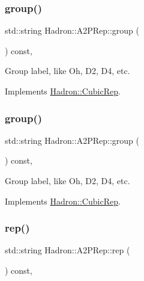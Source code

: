 \subsubsection{\texorpdfstring{group()}{group()}\hspace{0.1cm}{\footnotesize\ttfamily [1/2]}}
{\footnotesize\ttfamily std\+::string Hadron\+::\+A2\+P\+Rep\+::group (\begin{DoxyParamCaption}{ }\end{DoxyParamCaption}) const\hspace{0.3cm}{\ttfamily [inline]}, {\ttfamily [virtual]}}

Group label, like Oh, D2, D4, etc. 

Implements \mbox{\hyperlink{structHadron_1_1CubicRep_a0748f11ec87f387062c8e8981339a29c}{Hadron\+::\+Cubic\+Rep}}.

\mbox{\label{structHadron_1_1A2PRep_accbc36395d6c73bf53f8914b3219f902}} 
\subsubsection{\texorpdfstring{group()}{group()}\hspace{0.1cm}{\footnotesize\ttfamily [2/2]}}
{\footnotesize\ttfamily std\+::string Hadron\+::\+A2\+P\+Rep\+::group (\begin{DoxyParamCaption}{ }\end{DoxyParamCaption}) const\hspace{0.3cm}{\ttfamily [inline]}, {\ttfamily [virtual]}}

Group label, like Oh, D2, D4, etc. 

Implements \mbox{\hyperlink{structHadron_1_1CubicRep_a0748f11ec87f387062c8e8981339a29c}{Hadron\+::\+Cubic\+Rep}}.

\mbox{\label{structHadron_1_1A2PRep_aa2ba2d1bc832b1d1fdba1befcfe8a256}} 
\subsubsection{\texorpdfstring{rep()}{rep()}\hspace{0.1cm}{\footnotesize\ttfamily [1/2]}}
{\footnotesize\ttfamily std\+::string Hadron\+::\+A2\+P\+Rep\+::rep (\begin{DoxyParamCaption}{ }\end{DoxyParamCaption}) const\hspace{0.3cm}{\ttfamily [inline]}, {\ttfamily [virtual]}}

